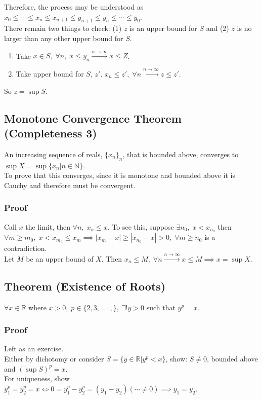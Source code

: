 \documentclass[11pt]{article}
\newcommand{\0}{\emptyset}
\newcommand{\N}{\mathbb{N}}
\newcommand{\R}{\mathbb{R}}
\begin{document}
Therefore, the process may be understood as \(x_{0}\leq\cdots\leq x_{n}\leq x_{n+1}\leq y_{n+1}\leq y_{n}\leq\cdots\leq y_{0}\).\\[0pt]
There remain two things to check: (1) \(z\) is an upper bound for \(S\) and (2) \(z\) is no larger than any other upper bound for \(S\).\\[0pt]
\begin{enumerate}
\item Take \(x\in S,\;\forall n,\;x\leq y_{n}\overset{n\to\infty}{\longrightarrow}x\leq Z\).\\[0pt]
\item Take upper bound for \(S\), \(z'\). \(x_{n}\leq z',\;\forall n\overset{n\to\infty}{\longrightarrow}z\leq z'\).\\[0pt]
\end{enumerate}
So \(z=\sup{S}\).\\[0pt]
\subsection*{Monotone Convergence Theorem (Completeness 3)}
\label{sec:orgbfebde7}
An increasing sequence of reals, \(\{x_{n}\}_{n}\), that is bounded above, converges to \(\sup{X}=\sup\{x_{n}|n\in\N\}\).\\[0pt]
To prove that this converges, since it is monotone and bounded above it is Cauchy and therefore must be convergent.\\[0pt]
\subsubsection*{Proof}
\label{sec:org6243b4a}
Call \(x\) the limit, then \(\forall n,\;x_{n}\leq x\). To see this, suppose \(\exists n_{0},\;x<x_{n_{0}}\) then \(\forall m\geq m_{0},\;x<x_{m_{0}}\leq x_{m} \implies |x_{m}-x|\geq|x_{n_{0}}-x|>0,\;\forall m\geq n_{0}\) is a contradiction.\\[0pt]
Let \(M\) be an upper bound of \(X\). Then \(x_{n}\leq M,\;\forall n\overset{n\to\infty}{\longrightarrow}x\leq M\implies x=\sup{X}\).\\[0pt]
\subsection*{Theorem (Existence of Roots)}
\label{sec:org0130a66}
\(\forall x\in\R\) where \(x>0,\;p\in\{2,3,\;\ldots\;,\},\;\exists!y>0\) such that \(y^{p}=x\).\\[0pt]
\subsubsection*{Proof}
\label{sec:org4a98fd9}
Left as an exercise.\\[0pt]
Either by dichotomy or consider \(S=\{y\in\R|y^{p}<x\}\), show: \(S\neq 0\), bounded above and \((\sup{S})^{p}=x\).\\[0pt]
For uniqueness, show \(y_{1}^{p}=y_{2}^{p}=x \iff 0=y_{1}^{p}-y_{2}^{p}=(y_{1}-y_{2})(\cdots\neq 0)\implies y_{1}=y_{2}\).\\[0pt]
\end{document}
